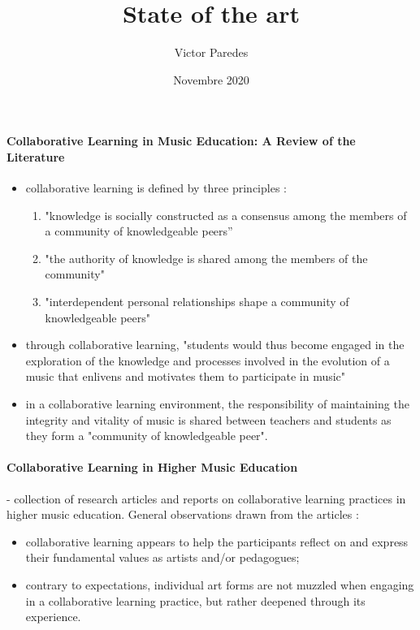 \documentclass[11pt]{article}
\title{State of the art}
\author{Victor Paredes}
\date{Novembre 2020}
\begin{document}
\maketitle

\tableofcontents

\paragraph{Collaborative Learning in Music Education: A Review of the Literature} \citep{luce_collaborative_2001}
\begin{itemize}
    \item collaborative learning is defined by three principles :
    \begin{enumerate}
        \item "knowledge is socially constructed as a consensus among the members of a community of knowledgeable peers”
        \item "the authority of knowledge is shared among the members of the community"
        \item "interdependent personal relationships shape a community of knowledgeable peers"
    \end{enumerate}
    \item through collaborative learning, "students would thus become engaged in the exploration of the knowledge and processes involved in the evolution of a music that enlivens and motivates them to participate in music"
    \item in a collaborative learning environment, the responsibility of maintaining the integrity and vitality of music is shared between teachers and students as they form a "community of knowledgeable peer".
\end{itemize}

\paragraph{Collaborative Learning in Higher Music Education} \citep{gaunt_collaborative_2016} -
collection of research articles and reports on collaborative learning practices in higher music education. General observations drawn from the articles :
\begin{itemize}
    \item collaborative learning appears to help the participants reflect on and express their fundamental values as artists and/or pedagogues;
    \item contrary to expectations, individual art forms are not muzzled when engaging in a collaborative learning practice, but rather deepened through its experience.
\end{itemize}
\end{document}
